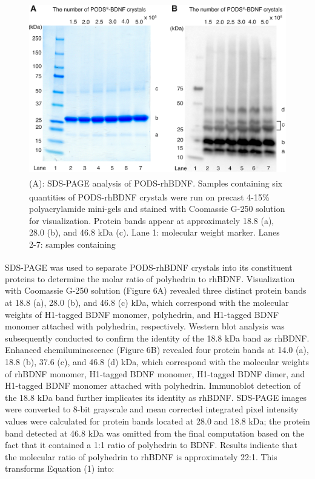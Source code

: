 \documentclass[review]{elsarticle}
\begin{document}
 \begin{figure}
 	\begin{center}
 		\includegraphics[width=13cm]{Fig_6.jpg}
 	\end{center}
 	\caption{(A): SDS-PAGE analysis of PODS\textsuperscript{\textregistered}-rhBDNF. Samples containing six quantities of PODS\textsuperscript{\textregistered}-rhBDNF crystals were run on precast 4-15\% polyacrylamide mini-gels and stained with Coomassie G-250 solution for visualization. Protein bands appear at approximately 18.8 (a), 28.0 (b), and 46.8 kDa (c). Lane 1: molecular weight marker. Lanes 2-7: samples containing   }
 \end{figure}
 
 
 SDS-PAGE was used to separate PODS\textsuperscript{\textregistered}-rhBDNF crystals into its constituent proteins to determine the molar ratio of polyhedrin to rhBDNF. Visualization with Coomassie G-250 solution (Figure 6A) revealed three distinct protein bands at 18.8 (a), 28.0 (b), and 46.8 (c) kDa, which correspond with the molecular weights of H1-tagged BDNF monomer, polyhedrin, and H1-tagged BDNF monomer attached with polyhedrin, respectively. Western blot analysis was subsequently conducted to confirm the identity of the 18.8 kDa band as rhBDNF. Enhanced chemiluminescence (Figure 6B) revealed four protein bands at 14.0 (a), 18.8 (b), 37.6 (c), and 46.8 (d) kDa, which correspond with the molecular weights of rhBDNF monomer, H1-tagged BDNF monomer, H1-tagged BDNF dimer, and H1-tagged BDNF monomer attached with polyhedrin. Immunoblot detection of the 18.8 kDa band further implicates its identity as rhBDNF. SDS-PAGE images were converted to 8-bit grayscale and mean corrected integrated pixel intensity values were calculated for protein bands located at 28.0 and 18.8 kDa; the protein band detected at 46.8 kDa was omitted from the final computation based on the fact that it contained a 1:1 ratio of polyhedrin to BDNF. Results indicate that the molecular ratio of polyhedrin to rhBDNF is approximately 22:1. This transforms Equation (1) into:
 
\end{document}
